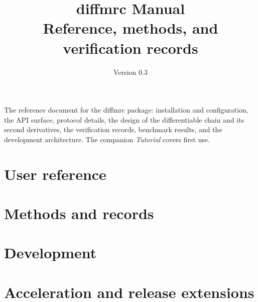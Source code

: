 \documentclass[11pt]{report}
\title{\textbf{diffmrc Manual}\\[4pt]
  \large Reference, methods, and verification records}
\author{}
\date{Version 0.3}
\begin{document}
\maketitle
\begin{center}
\begin{minipage}{0.85\textwidth}
\small
The reference document for the diffmrc package: installation and
configuration, the API surface, protocol details, the design of the
differentiable chain and its second derivatives, the verification
records, benchmark results, and the development architecture.  The
companion \emph{Tutorial} covers first use.
\end{minipage}
\end{center}
\tableofcontents
\clearpage
\part{User reference}




\part{Methods and records}





\part{Development}


\part{Acceleration and release extensions}







\end{document}
